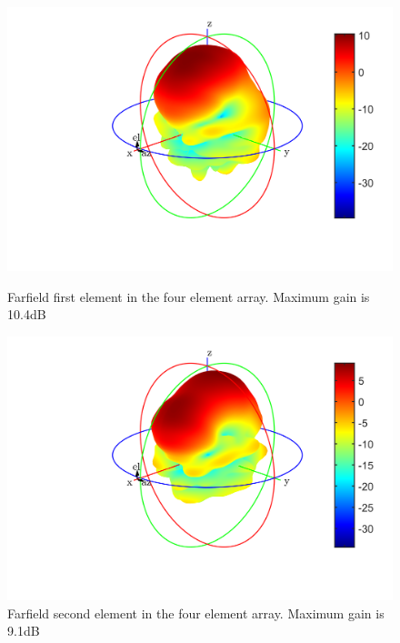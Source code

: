 \begin{figure}[H]
  \centering
  \begin{minipage}[b]{0.5\textwidth}
	\includegraphics[scale = 0.5]{figures/measurement/antennas/1st_element_4_array.png}
	\caption{Farfield first element in the four element array. Maximum gain is 10.4dB}
    \label{fig:chamber_four_ant_ff_1}
  \end{minipage}
  \hfill
  \begin{minipage}[b]{0.4\textwidth}
\includegraphics[scale = 0.5]{figures/measurement/antennas/2nd_element_4_array.png}
\caption{Farfield second element in the four element array. Maximum gain is 9.1dB}
    \label{fig:chamber_four_ant_ff:2}
  \end{minipage}
\end{figure}


